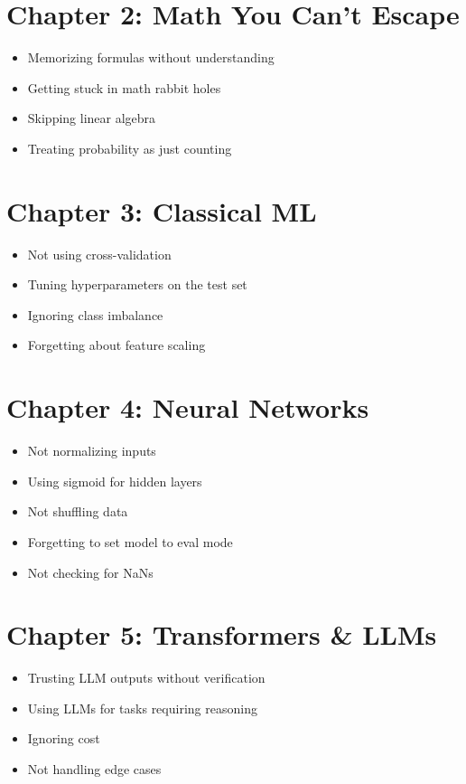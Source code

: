 \documentclass[11pt,oneside]{book}
\begin{document}
\section{Chapter 2: Math You Can't Escape}

\begin{itemize}
    \item Memorizing formulas without understanding
    \item Getting stuck in math rabbit holes
    \item Skipping linear algebra
    \item Treating probability as just counting
\end{itemize}

\section{Chapter 3: Classical ML}

\begin{itemize}
    \item Not using cross-validation
    \item Tuning hyperparameters on the test set
    \item Ignoring class imbalance
    \item Forgetting about feature scaling
\end{itemize}

\section{Chapter 4: Neural Networks}

\begin{itemize}
    \item Not normalizing inputs
    \item Using sigmoid for hidden layers
    \item Not shuffling data
    \item Forgetting to set model to eval mode
    \item Not checking for NaNs
\end{itemize}

\section{Chapter 5: Transformers \& LLMs}

\begin{itemize}
    \item Trusting LLM outputs without verification
    \item Using LLMs for tasks requiring reasoning
    \item Ignoring cost
    \item Not handling edge cases
\end{itemize}
\end{document}
